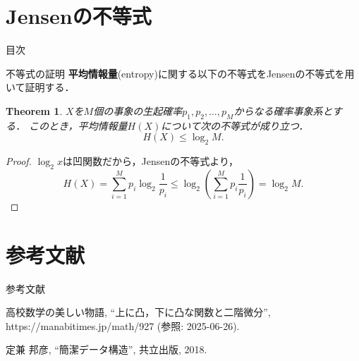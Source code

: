 \documentclass[dvipdfmx,aspectratio=169]{beamer}
\theoremstyle{plain}
\newtheorem{thm}{Theorem}
\theoremstyle{definition}
\begin{document}
\section{Jensenの不等式}
\begin{frame}{目次}
	\tableofcontents[currentsection]
\end{frame}


\begin{frame}{不等式の証明}
	\textbf{平均情報量}(entropy)に関する以下の不等式をJensenの不等式を用いて証明する．
	\begin{thm}
		$X$を$M$個の事象の生起確率$p_{1}, p_{2}, \ldots, p_{M}$からなる確率事象系とする．
		このとき，平均情報量$H(X)$について次の不等式が成り立つ．
		\[
			H(X) \le \log_2 M.
		\]
	\end{thm}

	\begin{proof}
		$\log_2 x$は凹関数だから，Jensenの不等式より，
		\[
			H(X) = \sum_{i=1}^M p_{i} \log_2 \frac{1}{p_{i}} \le \log_2 (\sum_{i=1}^M p_{i} \frac{1}{p_{i}}) = \log_2 M.
		\]
	\end{proof}
\end{frame}

\section*{参考文献}
\begin{frame}{参考文献}
	\begin{thebibliography}{9}
		\renewcommand{\baselinestretch}{1.0}
		\small
		\beamertemplatetextbibitems
		高校数学の美しい物語,
		``上に凸，下に凸な関数と二階微分'',
		https://manabitimes.jp/math/927
		(参照: 2025-06-26).

		定兼 邦彦,
		``簡潔データ構造'',
		共立出版, 2018.

	\end{thebibliography}
\end{frame}
\end{document}
